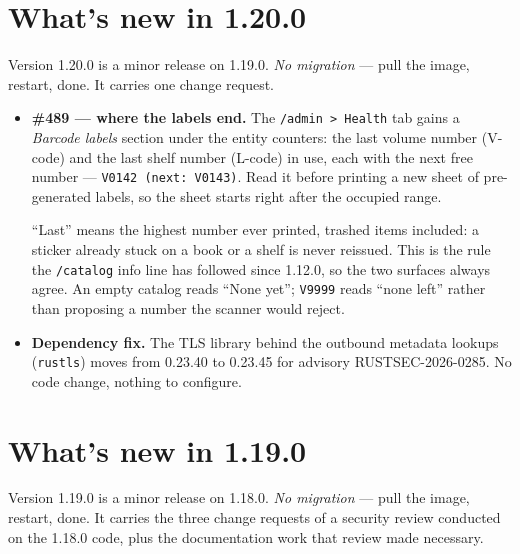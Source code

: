 \section{What's new in 1.20.0}\label{sec:whats-new-1.20.0}

Version 1.20.0 is a minor release on 1.19.0. \emph{No migration} ---
pull the image, restart, done. It carries one change request.

\begin{itemize}
  \item \textbf{\#489 \string— where the labels end.} The
        \texttt{/admin > Health} tab gains a \emph{Barcode labels}
        section under the entity counters: the last volume number
        (V-code) and the last shelf number (L-code) in use, each with
        the next free number --- \texttt{V0142 (next: V0143)}. Read it
        before printing a new sheet of pre-generated labels, so the
        sheet starts right after the occupied range.

        ``Last'' means the highest number ever printed, trashed items
        included: a sticker already stuck on a book or a shelf is never
        reissued. This is the rule the \texttt{/catalog} info line has
        followed since 1.12.0, so the two surfaces always agree. An
        empty catalog reads ``None yet''; \texttt{V9999} reads ``none
        left'' rather than proposing a number the scanner would reject.
  \item \textbf{Dependency fix.} The TLS library behind the outbound
        metadata lookups (\texttt{rustls}) moves from 0.23.40 to
        0.23.45 for advisory RUSTSEC-2026-0285. No code change, nothing
        to configure.
\end{itemize}

\section{What's new in 1.19.0}\label{sec:whats-new-1.19.0}

Version 1.19.0 is a minor release on 1.18.0. \emph{No migration} ---
pull the image, restart, done. It carries the three change requests of
a security review conducted on the 1.18.0 code, plus the documentation
work that review made necessary.

